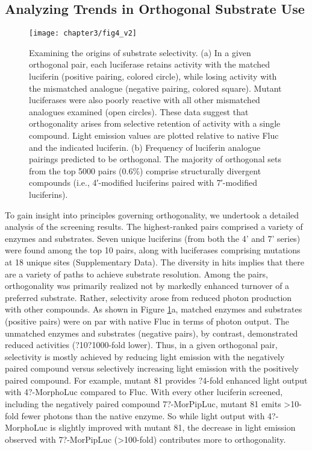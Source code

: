 \subsection*{Analyzing Trends in Orthogonal Substrate Use}
\begin{figure}[htb]
\texttt{[image: chapter3/fig4\_v2]}
\centering
\caption[Examining the origins of substrate selectivity]{Examining the origins of substrate selectivity. (a) In a given orthogonal pair, each luciferase retains activity with the matched luciferin (positive pairing, colored circle), while losing activity with the mismatched analogue (negative pairing, colored square). Mutant luciferases were also poorly reactive with all other mismatched analogues examined (open circles). These data suggest that orthogonality arises from selective retention of activity with a single compound. Light emission values are plotted relative to native Fluc and the indicated luciferin. (b) Frequency of luciferin analogue pairings predicted to be orthogonal. The majority of orthogonal sets from the top 5000 pairs (0.6\%{}) comprise structurally divergent compounds (i.e., 4′-modified luciferins paired with 7′-modified luciferins).}
  \label{fig:heatmap}
\end{figure}
To gain insight into principles governing orthogonality, we undertook a detailed analysis of the screening results. The highest-ranked pairs comprised a variety of enzymes and substrates. Seven unique luciferins (from both the 4' and 7' series) were found among the top 10 pairs, along with luciferases comprising mutations at 18 unique sites (Supplementary Data).
The diversity in hits implies that there are a variety of paths to achieve substrate resolution. Among the pairs, orthogonality was primarily realized not by markedly enhanced turnover of a preferred substrate. Rather, selectivity arose from reduced photon production with other compounds. As shown in Figure \ref{fig:heatmap}a, matched enzymes and substrates (positive pairs) were on par with native Fluc in terms of photon output. The unmatched enzymes and substrates (negative pairs), by contrast, demonstrated reduced activities (?10?1000-fold lower). Thus, in a given orthogonal pair, selectivity is mostly achieved by reducing light emission with the negatively paired compound versus selectively increasing light emission with the positively paired compound. For example, mutant 81 provides ?4-fold enhanced light output with 4?-MorphoLuc compared to Fluc. With every other luciferin screened, including the negatively paired compound 7?-MorPipLuc, mutant 81 emits >10-fold fewer photons than the native enzyme. So while light output with 4?-MorphoLuc is slightly improved with mutant 81, the decrease in light emission observed with 7?-MorPipLuc (>100-fold) contributes more to orthogonality.
